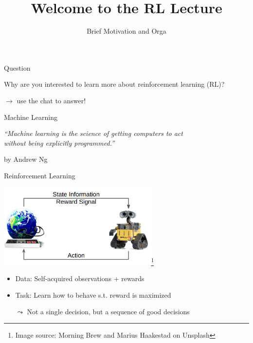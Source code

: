 


\title[ML-RL: Big Picture]{Welcome to the RL Lecture}
\subtitle{Brief Motivation and Orga}




	
	\maketitle

\begin{frame}[c]{Question}
	
	\centering
	{
	\huge
	Why are you interested to learn more about reinforcement learning (RL)?
	}

	\bigskip	\bigskip
	$\to$ use the chat to answer!
	
\end{frame}
\begin{frame}[c]{Machine Learning}

\centering
\textit{``Machine learning is the science of getting computers to act\\
 without being explicitly programmed.''}

\hfill by Andrew Ng

\end{frame}
\begin{frame}[c]{Reinforcement Learning}
	
	\centering
	\includegraphics[width=0.6\textwidth]{../w01_big_picture/images/rl_comic.png}\footnote{Image source: Morning Brew and Marius Haakestad on Unsplash}
	
	\bigskip
	
	\begin{itemize}
		\item Data: Self-acquired observations + rewards
		\item Task: Learn how to behave s.t. reward is maximized
		\item[$\leadsto$] Not a single decision, but a sequence of good decisions
	\end{itemize}	
	
	
\end{frame}

